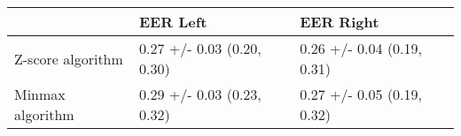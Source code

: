 \begin{tabular}{lll}
\toprule
{} &                    EER Left &                   EER Right \\
\midrule
Z-score algorithm &  0.27 +/- 0.03 (0.20, 0.30) &  0.26 +/- 0.04 (0.19, 0.31) \\
Minmax algorithm  &  0.29 +/- 0.03 (0.23, 0.32) &  0.27 +/- 0.05 (0.19, 0.32) \\
\bottomrule
\end{tabular}
